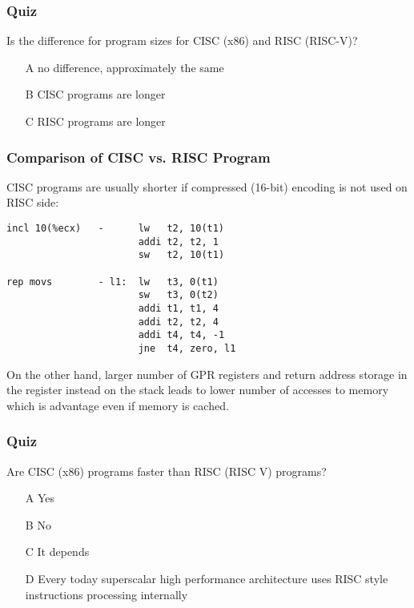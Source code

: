 \documentclass{beamer}
\begin{document}
\begin{frame}
\frametitle{Quiz}
Is the difference for program sizes for CISC (x86) and RISC (RISC-V)?
\begin{itemize}
\item[A] no difference, approximately the same
\item[B] CISC programs are longer
\item[C] RISC programs are longer
\end{itemize}
\end{frame}


\begin{frame}[fragile]
\frametitle{Comparison of CISC vs. RISC Program}
CISC programs are usually shorter if compressed (16-bit) encoding is not used on RISC side:
\begin{verbatim}
incl 10(%ecx)   -      lw   t2, 10(t1)
                       addi t2, t2, 1
                       sw   t2, 10(t1)

rep movs        - l1:  lw   t3, 0(t1) 
                       sw   t3, 0(t2)
                       addi t1, t1, 4
                       addi t2, t2, 4
                       addi t4, t4, -1
                       jne  t4, zero, l1 
\end{verbatim}
On the other hand, larger number of GPR registers and return address storage in the register instead on the stack leads to lower number of accesses to memory which is advantage even if memory is cached.
\end{frame}

\begin{frame}
\frametitle{Quiz}
Are CISC (x86) programs faster than RISC (RISC V) programs?
\begin{itemize}
\item[A] Yes
\item[B] No
\item[C] It depends
\item[D] Every today superscalar high performance architecture uses RISC style instructions processing internally
\end{itemize}

\end{frame}
\end{document}
